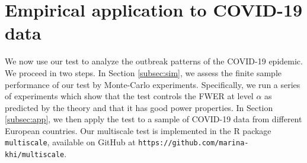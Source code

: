 \documentclass[a4paper,12pt]{article}
\numberwithin{equation}{section}
\begin{document}




\section{Empirical application to COVID-19 data}\label{sec:empirics} 


We now use our test to analyze the outbreak patterns of the COVID-19 epidemic. We proceed in two steps. In Section \ref{subsec:sim}, we assess the finite sample performance of our test by Monte-Carlo experiments. Specifically, we run a series of experiments which show that the test controls the FWER at level $\alpha$ as predicted by the theory and that it has good power properties. In Section \ref{subsec:app}, we then apply the test to a sample of COVID-19 data from different European countries. Our multiscale test is implemented in the R package \verb|multiscale|, available on GitHub at \texttt{https://github.com/marina-khi/multiscale}.
\end{document}
